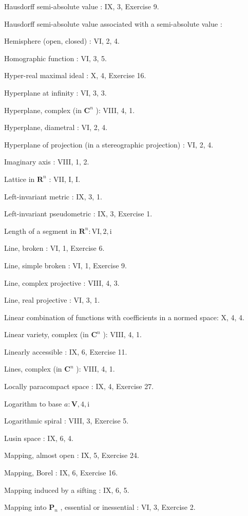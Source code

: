 Hausdorff semi-absolute value : IX, 3, Exercise 9.

Hausdorff semi-absolute value associated with a semi-absolute value :

Hemisphere (open, closed) : VI, 2, 4.

Homographic function : VI, 3, 5.

Hyper-real maximal ideal : X, 4, Exercise 16.

Hyperplane at infinity : VI, 3, 3.

Hyperplane, complex (in \(\mathbf{C}^n\) ): VIII, 4, 1.

Hyperplane, diametral : VI, 2, 4.

Hyperplane of projection (in a stereographic projection) : VI, 2, 4.

Imaginary axis : VIII, 1, 2.

Lattice in \(\mathbf{R}^n\) : VII, I, I.

Left-invariant metric : IX, 3, 1.

Left-invariant pseudometric : IX, 3, Exercise 1.

Length of a segment in \(\mathbf{R}^n:\mathrm{VI},2,\mathrm{i}\)

Line, broken : VI, 1, Exercise 6.

Line, simple broken : VI, 1, Exercise 9.

Line, complex projective : VIII, 4, 3.

Line, real projective : VI, 3, 1.

Linear combination of functions with coefficients in a normed space: X, 4, 4.

Linear variety, complex (in \(\mathbf{C}^n\) ): VIII, 4, 1.

Linearly accessible : IX, 6, Exercise 11.

Lines, complex (in \(\mathbf{C}^n\) ): VIII, 4, 1.

Locally paracompact space : IX, 4, Exercise 27.

Logarithm to base \(a:\mathbf{V},4,\mathrm{i}\)

Logarithmic spiral : VIII, 3, Exercise 5.

Lusin space : IX, 6, 4.

Mapping, almost open : IX, 5, Exercise 24.

Mapping, Borel : IX, 6, Exercise 16.

Mapping induced by a sifting : IX, 6, 5.

Mapping into \(\mathbf{P}_n\) , essential or inessential : VI, 3, Exercise 2.

